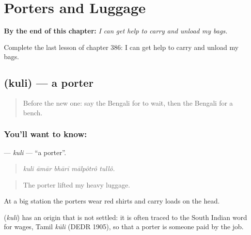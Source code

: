 
\chapter{Porters and Luggage}
\label{ch:bn-porters-and-luggage}

\begin{chapteropening}
\textbf{By the end of this chapter:} \emph{I can get help to carry and unload my bags.}

Complete the last lesson of chapter 386: I can get help to carry and unload my bags.
\end{chapteropening}

\section[\texorpdfstring{\bn{কুলি} (kuli)}{কুলি (kuli)}]{ (kuli) — a porter}

\label{lesson:BN-C386-kuli}



\begin{quote}
Before the new one: say the Bengali for to wait, then the Bengali for a bench.
\end{quote}

\subsection*{You'll want to know: }
\textbf{} — \emph{kuli} — \textquotedblleft{}a porter\textquotedblright{}.

\begin{quote}
    
\end{quote}

\begin{quote}
\emph{kuli āmār bhārī mālpôtrô tullô.}
\end{quote}

\begin{quote}
The porter lifted my heavy luggage.
\end{quote}

At a big station the porters wear red shirts and carry loads on the head.

\begin{cousinweb}
\textbf{} (\emph{kuli}) has an origin that is not settled: it is often traced to the South Indian word for wages, Tamil \emph{kūli} (DEDR 1905), so that a porter is someone paid by the job.
\end{cousinweb}

